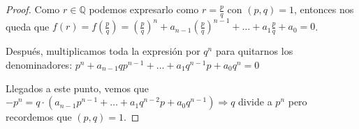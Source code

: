 \documentclass[paper=a4, fontsize=11pt, spanish]{scrartcl}
\begin{document}
\begin{enumerate}
\begin{proof}
			Como $r \in \mathbb{Q}$ podemos expresarlo como $\displaystyle r = \frac{p}{q}$ con $(p, q) = 1$,
			entonces nos queda que $\displaystyle f(r) = f\left(\frac{p}{q}\right) = \left(\frac{p}{q}\right)^n
			+ a_{n-1} \left(\frac{p}{q}\right)^{n-1} + \dots + a_1\frac{p}{q} + a_0 = 0$.
			
			Después, multiplicamos toda la expresión por $q^n$ para quitarnos los denominadores: $p^n +
			a_{n-1}qp^{n-1} + \dots + a_1q^{n-1}p + a_0q^n = 0$
			
			Llegados a este punto, vemos que $-p^n = q \cdot \left(a_{n-1}p^{n-1} + \dots + a_1q^{n-2}p +
			a_0q^{n-1}\right) \Rightarrow q$ divide a $p^n$ pero recordemos que $(p, q) = 1$.
		\end{proof}
	\end{enumerate}
\end{document}
